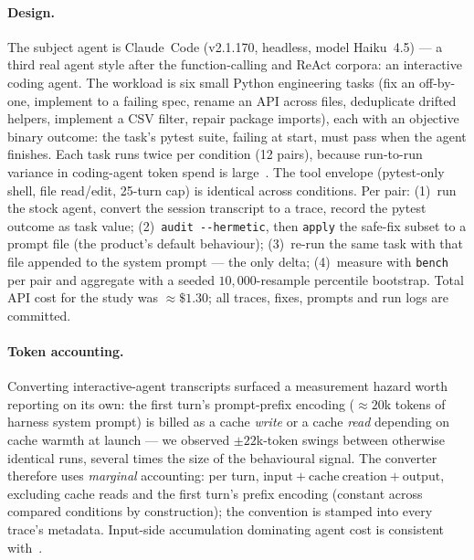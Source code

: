 \documentclass[11pt]{article}
\newcommand{\code}[1]{\texttt{#1}}
\begin{document}
\paragraph{Design.} The subject agent is Claude~Code (v2.1.170, headless,
model Haiku~4.5) --- a third real agent style after the function-calling and
ReAct corpora: an interactive coding agent. The workload is six small Python
engineering tasks (fix an off-by-one, implement to a failing spec, rename an
API across files, deduplicate drifted helpers, implement a CSV filter, repair
package imports), each with an objective binary outcome: the task's pytest
suite, failing at start, must pass when the agent finishes. Each task runs
twice per condition (12 pairs), because run-to-run variance in coding-agent
token spend is large~\cite{spendmoney}. The tool envelope (pytest-only shell,
file read/edit, 25-turn cap) is identical across conditions. Per pair:
(1)~run the stock agent, convert the session transcript to a trace, record the
pytest outcome as task value; (2)~\code{audit -{}-hermetic}, then \code{apply}
the safe-fix subset to a prompt file (the product's default behaviour);
(3)~re-run the same task with that file appended to the system prompt --- the
only delta; (4)~measure with \code{bench} per pair and aggregate with a
seeded $10{,}000$-resample percentile bootstrap. Total API cost for the study
was $\approx\$1.30$; all traces, fixes, prompts and run logs are committed.

\paragraph{Token accounting.} Converting interactive-agent transcripts
surfaced a measurement hazard worth reporting on its own: the first turn's
prompt-prefix encoding ($\approx20$k tokens of harness system prompt) is
billed as a cache \emph{write} or a cache \emph{read} depending on cache
warmth at launch --- we observed $\pm22$k-token swings between otherwise
identical runs, several times the size of the behavioural signal. The
converter therefore uses \emph{marginal} accounting: per turn,
$\mathrm{input} + \mathrm{cache\ creation} + \mathrm{output}$, excluding cache
reads and the first turn's prefix encoding (constant across compared
conditions by construction); the convention is stamped into every trace's
metadata. Input-side accumulation dominating agent cost is consistent
with~\cite{tokenomics}.
\end{document}
